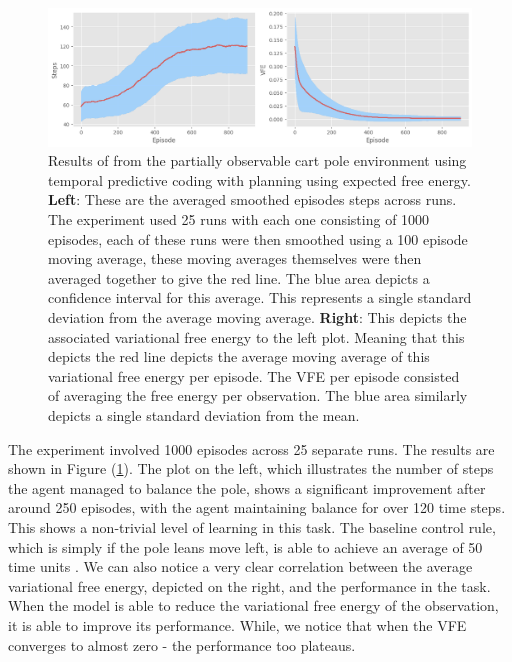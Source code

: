 \documentclass{article}
\newcommand{\refp}[1]{(\ref{#1})}
\begin{document}
\begin{figure}[htbp]
    \centering
    \includegraphics[scale=0.5]{images/tpc.png}
    \caption{Results of from the partially observable cart pole environment using temporal predictive coding with planning using expected free energy. \textbf{Left}: These are the averaged smoothed episodes steps across runs. The experiment used 25 runs with each one consisting of 1000 episodes, each of these runs were then smoothed using a 100 episode moving average, these moving averages themselves were then averaged together to give the red line. The blue area depicts a confidence interval for this average. This represents a single standard deviation from the average moving average. \textbf{Right}: This depicts the associated variational free energy to the left plot. Meaning that this depicts the red line depicts the average moving average of this variational free energy per episode. The VFE per episode consisted of averaging the free energy per observation. The blue area similarly depicts a single standard deviation from the mean.}
    \label{fig:tpc_results}
\end{figure}

The experiment involved 1000 episodes across 25 separate runs. The results are shown in Figure \refp{fig:tpc_results}. The plot on the left, which illustrates the number of steps the agent managed to balance the pole, shows a significant improvement after around 250 episodes, with the agent maintaining balance for over 120 time steps. This shows a non-trivial level of learning in this task. The baseline control rule, which is simply if the pole leans move left, is able to achieve an average of 50 time units \citep{millidge2019combining}. We can also notice a very clear correlation between the average variational free energy, depicted on the right, and the performance in the task. When the model is able to reduce the variational free energy of the observation, it is able to improve its performance. While, we notice that when the VFE converges to almost zero - the performance too plateaus. 

\
\end{document}
